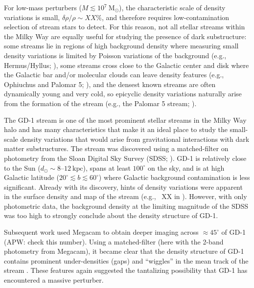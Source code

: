 \documentclass[12pt, modern]{aastex62}
\newcommand{\msun}{\textrm{M}_\odot}
\begin{document}
For low-mass perturbers ($M \lesssim 10^7~\msun$), the characteristic scale of density variations is small, $\delta\rho / \rho \sim XX\%$, and therefore requires low-contamination selection of stream stars to detect.
For this reason, not all stellar streams within the Milky Way are equally useful for studying the presence of dark substructure: some streams lie in regions of high background density where measuring small density variations is limited by Poisson variations of the background (e.g., Hermus/Hyllus; \citealt{Grillmair:2014}), some streams cross close to the Galactic center and disk where the Galactic bar and/or molecular clouds can leave density features (e.g., Ophiuchus and Palomar 5; \citealt{Price-Whelan:2016, Pearson:2017, Amorisco:2016}), and the densest known streams are often dynamically young and very cold, so epicyclic density variations naturally arise from the formation of the stream (e.g., the Palomar 5 stream; \citealt{Kupper:2008, Kupper:2015}).

The GD-1 stream \citep{Grillmair:2006, Price-Whelan:2018} is one of the most prominent stellar streams in the Milky Way halo and has many characteristics that make it an ideal place to study the small-scale density variations that would arise from gravitational interactions with dark matter substructures.
The stream was discovered using a matched-filter on photometry from the Sloan Digital Sky Survey (SDSS; \citealt{SDSS, TODO}).
GD-1 is relatively close to the Sun ($d_\odot \sim 8$--$12~\textrm{kpc}$), spans at least $100^\circ$ on the sky, and is at high Galactic latitude ($20^\circ \lesssim b \lesssim 60^\circ$) where Galactic background contamination is less significant.
Already with its discovery, hints of density variations were apparent in the surface density and map of the stream (e.g., \figurename~XX in \citealt{Grillmair:2006}).
However, with only photometric data, the background density at the limiting magnitude of the SDSS was too high to strongly conclude about the density structure of GD-1.

Subsequent work used Megacam \citep{instrument paper} to obtain deeper imaging across $\approx 45^\circ$ of GD-1 (APW: check this number).
Using a matched-filter (here with the 2-band photometry from Megacam), it became clear that the density structure of GD-1 contains prominent under-densities (gaps) and ``wiggles'' in the mean track of the stream \citep{deBoer:2018}.
These features again suggested the tantalizing possibility that GD-1 has encountered a massive perturber.
\end{document}
